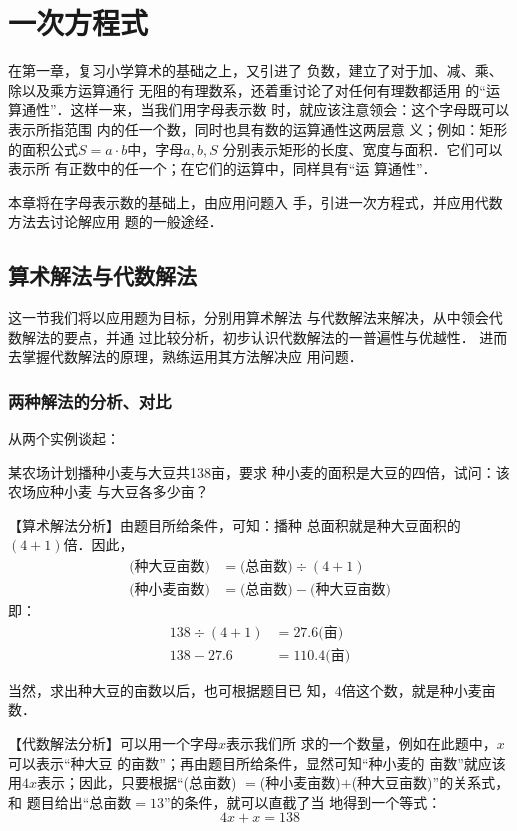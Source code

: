 \chapter{一次方程式}


    在第一章，复习小学算术的基础之上，又引进了
负数，建立了对于加、减、乘、除以及乘方运算通行
无阻的有理数系，还着重讨论了对任何有理数都适用
的“运算通性”．这样一来，当我们用字母表示数
时，就应该注意领会：这个字母既可以表示所指范围
内的任一个数，同时也具有数的运算通性这两层意
义；例如：矩形的面积公式$S=a\cdot b$中，字母$a,  b,  S$
分别表示矩形的长度、宽度与面积．它们可以表示所
有正数中的任一个；在它们的运算中，同样具有“运
算通性”．

    本章将在字母表示数的基础上，由应用问题入
手，引进一次方程式，并应用代数方法去讨论解应用
题的一般途经．

\section{算术解法与代数解法}
    这一节我们将以应用题为目标，分别用算术解法
与代数解法来解决，从中领会代数解法的要点，并通
过比较分析，初步认识代数解法的一普遍性与优越性．
进而去掌握代数解法的原理，熟练运用其方法解决应
用问题．

\subsection{两种解法的分析、对比}
从两个实例谈起：

\begin{example}
    某农场计划播种小麦与大豆共138亩，要求
种小麦的面积是大豆的四倍，试问：该农场应种小麦
与大豆各多少亩？
\end{example}

【算术解法分析】由题目所给条件，可知：播种
总面积就是种大豆面积的$(4 + 1)$倍．因此，
\[\begin{split}
    \text{(种大豆亩数)}&=\text{(总亩数)}\div (4 + 1)\\
    \text{(种小麦亩数)}&=\text{(总亩数)}-\text{(种大豆亩数)}
\end{split}\]
即：
\begin{align*}
    138\div(4 + 1)&=27.6\text{(亩)}\tag{大豆亩数}\\
    138-27. 6 &= 110.4\text{(亩)}\tag{小麦亩数}
\end{align*}

当然，求出种大豆的亩数以后，也可根据题目已
知，4倍这个数，就是种小麦亩数．

【代数解法分析】可以用一个字母$x$表示我们所
求的一个数量，例如在此题中，$x$可以表示“种大豆
的亩数”；再由题目所给条件，显然可知“种小麦的
亩数”就应该用$4x$表示；因此，只要根据“(总亩数)
$=$(种小麦亩数)$+$(种大豆亩数)”的关系式，和
题目给出“总亩数$=13$”的条件，就可以直截了当
地得到一个等式：
\[4x+x=138\]    

